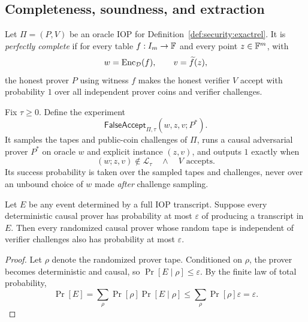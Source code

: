 \subsection{Completeness, soundness, and extraction}\label{sec:security:soundness}

\begin{definition}\label{def:security:complete}
Let $\Pi=(P,V)$ be an oracle IOP for Definition~\ref{def:security:exactrel}. It is \emph{perfectly complete} if for every table $f:I_m\to\mathbb{F}$ and every point $z\in\mathbb{F}^m$, with
\[
 w=\operatorname{Enc}_\mathcal D(f),\qquad v=\widetilde f(z),
\]
the honest prover $P$ using witness $f$ makes the honest verifier $V$ accept with probability $1$ over all independent prover coins and verifier challenges.
\end{definition}

\begin{definition}\label{def:security:bad-proof}
Fix $\tau\geq0$. Define the experiment
\[
 \mathsf{FalseAccept}_{\Pi,\tau}(w,z,v;P^*).
\]
It samples the tapes and public-coin challenges of $\Pi$, runs a causal adversarial prover $P^*$ on oracle $w$ and explicit instance $(z,v)$, and outputs $1$ exactly when
\[
  (w;z,v)\notin\mathcal L_\tau
  \quad\land\quad V\text{ accepts}.
\]
Its success probability is taken over the sampled tapes and challenges, never over an unbound choice of $w$ made \emph{after} challenge sampling.
\end{definition}

\begin{lemma}\label{lem:security:randomized-prover}
Let $E$ be any event determined by a full IOP transcript. Suppose every deterministic causal prover has probability at most $\varepsilon$ of producing a transcript in $E$. Then every randomized causal prover whose random tape is independent of verifier challenges also has probability at most $\varepsilon$.
\end{lemma}
\begin{proof}
Let $\rho$ denote the randomized prover tape. Conditioned on $\rho$, the prover becomes deterministic and causal, so $\Pr[E\mid\rho]\leq\varepsilon$. By the finite law of total probability,
\[
  \Pr[E]=\sum_\rho\Pr[\rho]\Pr[E\mid\rho]
   \leq\sum_\rho\Pr[\rho]\varepsilon=\varepsilon.
\]
\end{proof}

